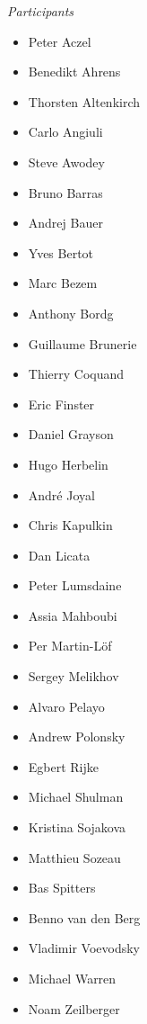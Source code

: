 {\bigskip
\centerline{\emph{Participants}}
%
\begin{multicols}{3}{
\begin{itemize}
\item[] Peter Aczel
\item[] Benedikt Ahrens
\item[] Thorsten Altenkirch
\item[] Carlo Angiuli
\item[] Steve Awodey
\item[] Bruno Barras
\item[] Andrej Bauer
\item[] Yves Bertot
\item[] Marc Bezem
\item[] Anthony Bordg
\item[] Guillaume Brunerie
\item[] Thierry Coquand
\item[] Eric Finster
\item[] Daniel Grayson
\item[] Hugo Herbelin
\item[] Andr\'e Joyal
\item[] Chris Kapulkin
\item[] Dan Licata
\item[] Peter Lumsdaine
\item[] Assia Mahboubi
\item[] Per Martin-L\"of
\item[] Sergey Melikhov
\item[] Alvaro Pelayo
\item[] Andrew Polonsky
\item[] Egbert Rijke
\item[] Michael Shulman
\item[] Kristina Sojakova
\item[] Matthieu Sozeau
\item[] Bas Spitters
\item[] Benno van den Berg
\item[] Vladimir Voevodsky
\item[] Michael Warren
\item[] Noam Zeilberger
\end{itemize}
}
\end{multicols}


}
